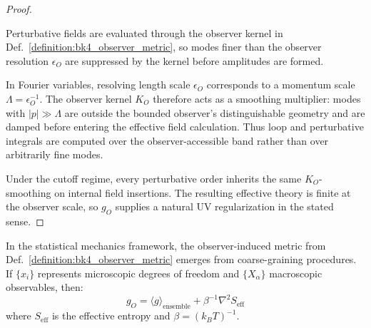 \begin{proof}
\label{proof:bk4_field_regularization}
\leavevmode

\begin{assumption}
Perturbative fields are evaluated through the observer kernel in
Def.~\ref{definition:bk4_observer_metric}, so modes finer than the observer
resolution $\epsilon_O$ are suppressed by the kernel before amplitudes are
formed.
\end{assumption}

In Fourier variables, resolving length scale $\epsilon_O$ corresponds to a
momentum scale $\Lambda=\epsilon_O^{-1}$. The observer kernel $K_O$ therefore
acts as a smoothing multiplier: modes with $|p|\gg\Lambda$ are outside the
bounded observer's distinguishable geometry and are damped before entering the
effective field calculation. Thus loop and perturbative integrals are computed
over the observer-accessible band rather than over arbitrarily fine modes.

Under the cutoff regime, every perturbative order inherits the same
$K_O$-smoothing on internal field insertions. The resulting effective theory is
finite at the observer scale, so $g_O$ supplies a natural UV regularization in
the stated sense.
\end{proof}

\begin{lemma}\label{lemma:bk4_statistical_mechanics}
In the statistical mechanics framework, the observer-induced metric from Def.~\ref{definition:bk4_observer_metric} emerges from coarse-graining procedures. If $\{x_i\}$ represents microscopic degrees of freedom and $\{X_\alpha\}$ macroscopic observables, then:
\begin{equation}
    g_O = \langle g \rangle_{\text{ensemble}} + \beta^{-1} \nabla^2 S_{\text{eff}}
\end{equation}
where $S_{\text{eff}}$ is the effective entropy and $\beta = (k_B T)^{-1}$.
\end{lemma}

